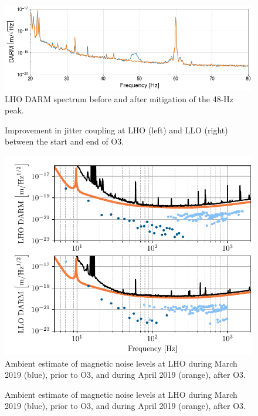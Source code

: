 \documentclass[11pt]{article}
\begin{document}
\begin{figure}
	\centering
	\includegraphics[width=\textwidth]{figures/noise-48Hz.png}
	\caption{LHO DARM spectrum before and after mitigation of the 48-Hz peak.}
	\label{fig:noise_48hz}
\end{figure}

\begin{figure}
	\centering
	\caption{Improvement in jitter coupling at LHO (left) and LLO (right) between the start and end of O3.}
	\label{fig:noise_jitter}
\end{figure}

\begin{figure}[h]
	\centering
	\includegraphics[width=\textwidth]{figures/noise-ambient-mag.pdf}
	\caption{
		Ambient estimate of magnetic noise levels at LHO during March 2019 (blue), prior to O3, and during April 2019 (orange), after O3.}
	\label{fig:noise_ambient_mag}
\end{figure}

\begin{figure}
	\centering
	\caption{
		Ambient estimate of magnetic noise levels at LHO during March 2019 (blue), prior to O3, and during April 2019 (orange), after O3.}
	\label{fig:weekly-mag-preO3}
\end{figure}
\end{document}
